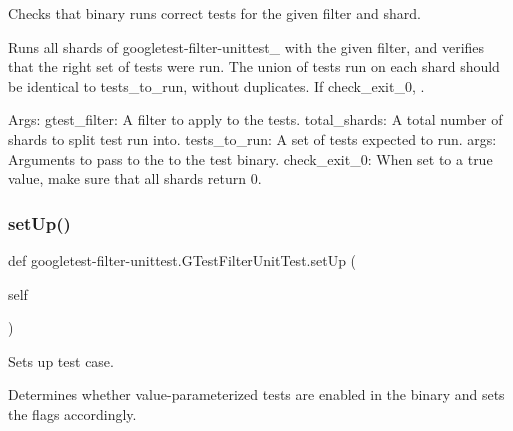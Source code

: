 \begin{DoxyVerb}Checks that binary runs correct tests for the given filter and shard.

Runs all shards of googletest-filter-unittest_ with the given filter, and
verifies that the right set of tests were run. The union of tests run
on each shard should be identical to tests_to_run, without duplicates.
If check_exit_0, .

Args:
  gtest_filter: A filter to apply to the tests.
  total_shards: A total number of shards to split test run into.
  tests_to_run: A set of tests expected to run.
  args: Arguments to pass to the to the test binary.
  check_exit_0: When set to a true value, make sure that all shards return
0.
\end{DoxyVerb}
 \mbox{\label{classgoogletest-filter-unittest_1_1GTestFilterUnitTest_a5aedf9d24243167acee87c9ddba82cc7}} 
\subsubsection{\texorpdfstring{set\+Up()}{setUp()}}
{\footnotesize\ttfamily def googletest-\/filter-\/unittest.\+G\+Test\+Filter\+Unit\+Test.\+set\+Up (\begin{DoxyParamCaption}\item[{}]{self }\end{DoxyParamCaption})}

\begin{DoxyVerb}Sets up test case.

Determines whether value-parameterized tests are enabled in the binary and
sets the flags accordingly.
\end{DoxyVerb}
 \mbox{\label{classgoogletest-filter-unittest_1_1GTestFilterUnitTest_a06eb05518484509b13dc139aafd610ce}} 
